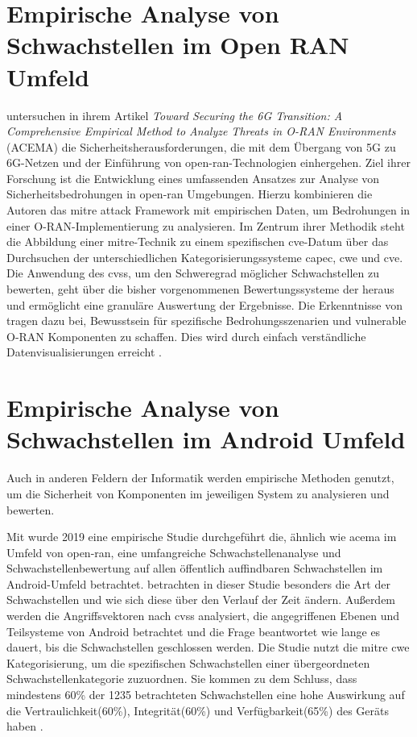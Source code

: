 \section{Empirische Analyse von Schwachstellen im Open RAN Umfeld}
\label{sec:forschungsstand-acema}
\citeauthor{klementSecuring6GTransition2024} untersuchen in ihrem Artikel \textit{Toward Securing the 6G Transition: A Comprehensive Empirical Method to Analyze Threats in O-RAN Environments} (ACEMA) die Sicherheitsherausforderungen, die mit dem Übergang von 5G zu 6G-Netzen und der Einführung von \gls{open-ran}-Technologien einhergehen. Ziel ihrer Forschung ist die Entwicklung eines umfassenden Ansatzes zur Analyse von Sicherheitsbedrohungen in \gls{open-ran} Umgebungen. Hierzu kombinieren die Autoren das \gls{mitre} \gls{attack} Framework mit empirischen Daten, um Bedrohungen in einer O-RAN-Implementierung zu analysieren. Im Zentrum ihrer Methodik steht die Abbildung einer \gls{mitre}-Technik zu einem spezifischen \gls{cve}-Datum über das Durchsuchen der unterschiedlichen Kategorisierungssysteme \gls{capec}, \gls{cwe} und \gls{cve}. Die Anwendung des \gls{cvss}, um den Schweregrad möglicher Schwachstellen zu bewerten, geht über die bisher vorgenommenen Bewertungssysteme der \orana{} heraus und ermöglicht eine granuläre Auswertung der Ergebnisse. Die Erkenntnisse von \citeauthor{klementSecuring6GTransition2024} tragen dazu bei, Bewusstsein für spezifische Bedrohungsszenarien und vulnerable O-RAN Komponenten zu schaffen. Dies wird durch einfach verständliche Datenvisualisierungen erreicht \autocite{klementSecuring6GTransition2024}.

%
\section{Empirische Analyse von Schwachstellen im Android Umfeld}
\label{sec:forschungsstand-android}
Auch in anderen Feldern der Informatik werden empirische Methoden genutzt, um die Sicherheit von Komponenten im jeweiligen System zu analysieren und bewerten.
\par Mit  wurde 2019 eine empirische Studie durchgeführt die, ähnlich wie \gls{acema} im Umfeld von \gls{open-ran}, eine umfangreiche Schwachstellenanalyse und Schwachstellenbewertung auf allen öffentlich auffindbaren Schwachstellen im Android-Umfeld betrachtet. \citeauthor{mazuera-rozoAndroidOSStack2019} betrachten in dieser Studie besonders die Art der Schwachstellen und wie sich diese über den Verlauf der Zeit ändern. Außerdem werden die Angriffsvektoren nach \gls{cvss} analysiert, die angegriffenen Ebenen und Teilsysteme von Android betrachtet und die Frage beantwortet wie lange es dauert, bis die Schwachstellen geschlossen werden. Die Studie nutzt die \gls{mitre} \gls{cwe} Kategorisierung, um die spezifischen Schwachstellen einer übergeordneten Schwachstellenkategorie zuzuordnen. Sie kommen zu dem Schluss, dass mindestens 60\% der 1235 betrachteten Schwachstellen eine hohe Auswirkung auf die Vertraulichkeit(60\%), Integrität(60\%) und Verfügbarkeit(65\%) des Geräts haben \autocite{mazuera-rozoAndroidOSStack2019}.